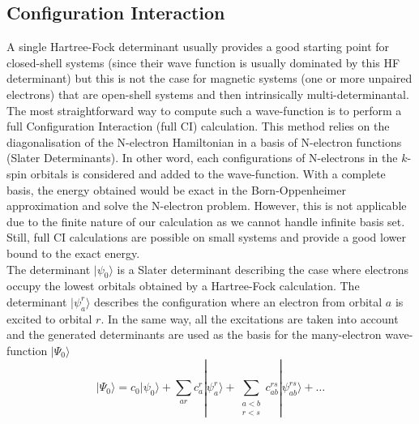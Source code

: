\documentclass[12pt,a4paper]{report}
\numberwithin{equation}{section}
\begin{document}
\subsection{Configuration Interaction}

A single Hartree-Fock determinant usually provides a good starting point for closed-shell systems (since their wave function is usually dominated by this HF determinant) but this is not the case for magnetic systems (one or more unpaired electrons) that are open-shell systems and then intrinsically multi-determinantal. The most straightforward way to compute such a wave-function is to perform a full Configuration Interaction (full CI) calculation.
This method relies on the diagonalisation of the N-electron Hamiltonian in a basis of N-electron functions (Slater Determinants).
In other word, each configurations of N-electrons in the $k$-spin orbitals is considered and added to the wave-function.
With a complete basis, the energy obtained would be exact in the Born-Oppenheimer approximation and solve the N-electron problem.
However, this is not applicable due to the finite nature of our calculation as we cannot handle infinite basis set.
Still, full CI calculations are possible on small systems and provide a good lower bound to the exact energy. \\
The determinant $|\psi_0\rangle$ is a Slater determinant describing the case where electrons occupy the lowest orbitals obtained by a Hartree-Fock calculation.
The determinant $|\psi_a^r\rangle$ describes the configuration where an electron from orbital $a$ is excited to orbital $r$.
In the same way, all the excitations are taken into account and the generated determinants are used as the basis for the many-electron wave-function $|\Psi_0\rangle$
\begin{equation}\label{eq:FullCI}
    | \Psi_0 \rangle = c_0 |\psi_0 \rangle + \sum_{ar} c_a^r |\psi_a^r \rangle + \sum_{\substack{a<b\\ r<s}} c_{ab}^{rs} |\psi_{ab}^{rs} \rangle + \ldots
\end{equation}
\end{document}
